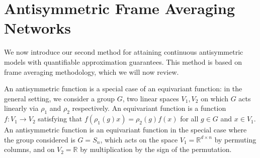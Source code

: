 \documentclass{amsart}
\theoremstyle{plain}
\theoremstyle{definition}
\theoremstyle{remark}
\newcommand{\RR}{\mathbb{R}}
\begin{document}
\section{Antisymmetric Frame Averaging Networks} 
\label{ssec:afanet}
We now introduce our second method for attaining continuous antisymmetric models with quantifiable approximation guarantees. This method is based on frame averaging methodology, which we will now review. 

An antisymmetric function is a special case of an equivariant function: in the general setting, we consider a group $G$, two linear spaces $V_1,V_2$ on which $G$ acts linearly via $\rho_1$ and $\rho_2$ respectively. An equivariant function is a function $f:V_1\to V_2$ satisfying that $f(\rho_1(g)x)=\rho_2(g)f(x) $ for all $g\in G$ and $x\in V_1$. An antisymmetric function is an equivariant function in the special case where the group considered is $G=S_n$, which acts on the space $V_1=\RR^{d\times n}$ by permuting columns, and on  $V_2=\RR$ by multiplication by the sign of the permutation.
\end{document}

